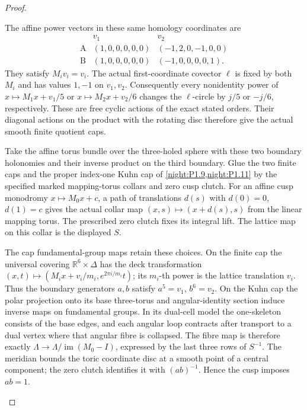 \documentclass[11pt,a4paper]{article}
\theoremstyle{definition}
\begin{document}
\begin{proof}
\begin{enumerate}[label=\arabic*.]
The affine power vectors in these same homology coordinates are
\[
\begin{array}{c|cc}
 &v_1&v_2\\\hline
 \mathrm A&(1,0,0,0,0,0)&(-1,2,0,-1,0,0)\\
 \mathrm B&(1,0,0,0,0,0)&(-1,0,0,0,0,1).
\end{array}
\]
They satisfy $M_iv_i=v_i$. The actual first-coordinate covector
$\ell$ is fixed by both $M_i$ and has values $1,-1$ on $v_1,v_2$.
Consequently every nonidentity power of
$x\mapsto M_1x+v_1/5$ or $x\mapsto M_2x+v_2/6$ changes the
$\ell$-circle by $j/5$ or $-j/6$, respectively. These are free
cyclic actions of the exact stated orders. Their diagonal actions
on the product with the rotating disc therefore give the actual
smooth finite quotient caps.

Take the affine torus bundle over the three-holed sphere with these
two boundary holonomies and their inverse product on the third
boundary. Glue the two finite caps and the proper index-one Kuhn
cap of \cref{night:P1.9,night:P1.11} by the
specified marked mapping-torus collars and zero cusp clutch.
For an affine cusp monodromy $x\mapsto M_0x+c$, a path of translations
$d(s)$ with $d(0)=0$, $d(1)=c$ gives the actual collar map
$(x,s)\mapsto(x+d(s),s)$ from the linear mapping torus. The prescribed
zero clutch fixes its integral lift. The lattice map on this collar
is the displayed $S$.

The cap fundamental-group maps retain these choices. On the finite
cap the universal covering $\mathbb R^6\times\Delta$ has the deck
transformation
$(x,t)\mapsto(M_ix+v_i/m_i,e^{2\pi i/m_i}t)$; its $m_i$-th power
is the lattice translation $v_i$. Thus the boundary generators
$a,b$ satisfy $a^5=v_1$, $b^6=v_2$. On the Kuhn cap the polar
projection onto its base three-torus and angular-identity section
induce inverse maps on fundamental groups. In its dual-cell model
the one-skeleton consists of the base edges, and each angular loop
contracts after transport to a dual vertex where that angular
fibre is collapsed. The fibre map is therefore exactly
$\Lambda\to\Lambda/\operatorname{im}(M_0-I)$, expressed by the last
three rows of $S^{-1}$. The meridian bounds the toric coordinate
disc at a smooth point of a central component; the zero clutch
identifies it with $(ab)^{-1}$. Hence the cusp imposes $ab=1$.


\end{enumerate}
\end{proof}
\end{document}
